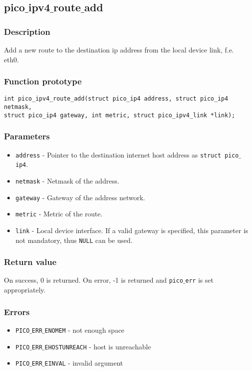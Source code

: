 \subsection{pico$\_$ipv4$\_$route$\_$add}

\subsubsection*{Description}
Add a new route to the destination ip address from the local device link, f.e. eth0.

\subsubsection*{Function prototype}
\begin{verbatim}
int pico_ipv4_route_add(struct pico_ip4 address, struct pico_ip4 netmask,
struct pico_ip4 gateway, int metric, struct pico_ipv4_link *link);
\end{verbatim}

\subsubsection*{Parameters}
\begin{itemize}
\item \texttt{address} - Pointer to the destination internet host address as \texttt{struct pico$\_$ip4}.
\item \texttt{netmask} - Netmask of the address.
\item \texttt{gateway} - Gateway of the address network.
\item \texttt{metric} - Metric of the route.
\item \texttt{link} - Local device interface. If a valid gateway is specified, this parameter is not mandatory,
thus \texttt{NULL} can be used.
\end{itemize}

\subsubsection*{Return value}
On success, 0 is returned. On error, -1 is returned and \texttt{pico$\_$err} is set appropriately. 

\subsubsection*{Errors}
\begin{itemize}[noitemsep]
\item \texttt{PICO$\_$ERR$\_$ENOMEM} - not enough space
\item \texttt{PICO$\_$ERR$\_$EHOSTUNREACH} - host is unreachable
\item \texttt{PICO$\_$ERR$\_$EINVAL} - invalid argument
\end{itemize}

